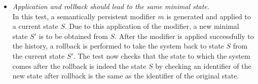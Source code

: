 \begin{enumerate}[\IEEEsetlabelwidth{Z}]
\begin{itemize}[]

\item \textit{Application and rollback should lead to the same minimal state.}\\

In this test, a semantically persistent modifier $m$ is generated and applied to a current state $S$. Due to this application of the modifier, a new minimal state $S'$ is to be obtained from $S$. After the modifier is applied successfully to the history, a rollback is performed to take the system back to state $S$ from the current state $S'$. The test now checks that the state to which the system comes after the rollback is indeed the state $S$ by checking an identifier of the new state after rollback is the same as the identifier of the original state.\\


\end{itemize}
\end{enumerate}
